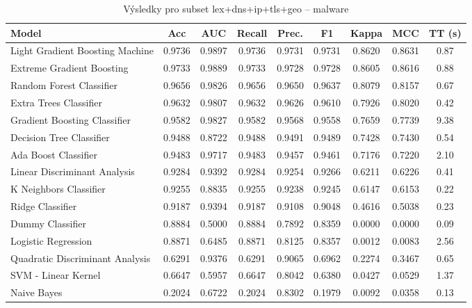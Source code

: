 \begin{table}[H]
  \centering
  \small
  \caption{Výsledky pro subset lex+dns+ip+tls+geo – malware}
  \begin{tabular}{|l|c|c|c|c|c|c|c|c|}
    \hline
    \textbf{Model} & \textbf{Acc} & \textbf{AUC} & \textbf{Recall} & \textbf{Prec.} & \textbf{F1} & \textbf{Kappa} & \textbf{MCC} & \textbf{TT (s)} \\
    \hline
    Light Gradient Boosting Machine & 0.9736 & 0.9897 & 0.9736 & 0.9731 & 0.9731 & 0.8620 & 0.8631 & 0.87 \\
    Extreme Gradient Boosting & 0.9733 & 0.9889 & 0.9733 & 0.9728 & 0.9728 & 0.8605 & 0.8616 & 0.88 \\
    Random Forest Classifier & 0.9656 & 0.9826 & 0.9656 & 0.9650 & 0.9637 & 0.8079 & 0.8157 & 0.67 \\
    Extra Trees Classifier & 0.9632 & 0.9807 & 0.9632 & 0.9626 & 0.9610 & 0.7926 & 0.8020 & 0.42 \\
    Gradient Boosting Classifier & 0.9582 & 0.9827 & 0.9582 & 0.9568 & 0.9558 & 0.7659 & 0.7739 & 9.38 \\
    Decision Tree Classifier & 0.9488 & 0.8722 & 0.9488 & 0.9491 & 0.9489 & 0.7428 & 0.7430 & 0.54 \\
    Ada Boost Classifier & 0.9483 & 0.9717 & 0.9483 & 0.9457 & 0.9461 & 0.7176 & 0.7220 & 2.10 \\
    Linear Discriminant Analysis & 0.9284 & 0.9392 & 0.9284 & 0.9254 & 0.9266 & 0.6211 & 0.6226 & 0.41 \\
    K Neighbors Classifier & 0.9255 & 0.8835 & 0.9255 & 0.9238 & 0.9245 & 0.6147 & 0.6153 & 0.22 \\
    Ridge Classifier & 0.9187 & 0.9394 & 0.9187 & 0.9108 & 0.9048 & 0.4616 & 0.5038 & 0.23 \\
    Dummy Classifier & 0.8884 & 0.5000 & 0.8884 & 0.7892 & 0.8359 & 0.0000 & 0.0000 & 0.09 \\
    Logistic Regression & 0.8871 & 0.6485 & 0.8871 & 0.8125 & 0.8357 & 0.0012 & 0.0083 & 2.56 \\
    Quadratic Discriminant Analysis & 0.6291 & 0.9376 & 0.6291 & 0.9065 & 0.6962 & 0.2274 & 0.3467 & 0.65 \\
    SVM - Linear Kernel & 0.6647 & 0.5957 & 0.6647 & 0.8042 & 0.6380 & 0.0427 & 0.0529 & 1.37 \\
    Naive Bayes & 0.2024 & 0.6722 & 0.2024 & 0.8302 & 0.1979 & 0.0092 & 0.0358 & 0.13 \\
    \hline
  \end{tabular}
\end{table}
\vspace{0.5cm}

